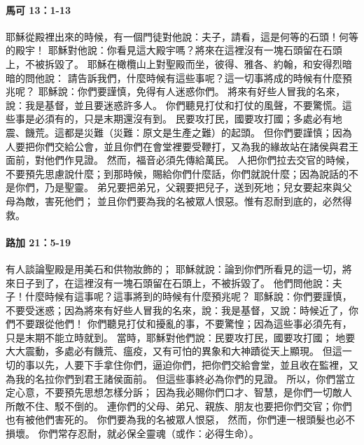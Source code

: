 \paragraph{馬可 13：1-13}
耶穌從殿裡出來的時候，有一個門徒對他說：夫子，請看，這是何等的石頭！何等的殿宇！
耶穌對他說：你看見這大殿宇嗎？將來在這裡沒有一塊石頭留在石頭上，不被拆毀了。
耶穌在橄欖山上對聖殿而坐，彼得、雅各、約翰，和安得烈暗暗的問他說：
請告訴我們，什麼時候有這些事呢？這一切事將成的時候有什麼預兆呢？
耶穌說：你們要謹慎，免得有人迷惑你們。
將來有好些人冒我的名來，說：我是基督，並且要迷惑許多人。
你們聽見打仗和打仗的風聲，不要驚慌。這些事是必須有的，只是末期還沒有到。
民要攻打民，國要攻打國；多處必有地震、饑荒。這都是災難（災難：原文是生產之難）的起頭。
但你們要謹慎；因為人要把你們交給公會，並且你們在會堂裡要受鞭打，又為我的緣故站在諸侯與君王面前，對他們作見證。
然而，福音必須先傳給萬民。
人把你們拉去交官的時候，不要預先思慮說什麼；到那時候，賜給你們什麼話，你們就說什麼；因為說話的不是你們，乃是聖靈。
弟兄要把弟兄，父親要把兒子，送到死地；兒女要起來與父母為敵，害死他們；
並且你們要為我的名被眾人恨惡。惟有忍耐到底的，必然得救。


\paragraph{路加 21：5-19}
有人談論聖殿是用美石和供物妝飾的；
耶穌就說：論到你們所看見的這一切，將來日子到了，在這裡沒有一塊石頭留在石頭上，不被拆毀了。
他們問他說：夫子！什麼時候有這事呢？這事將到的時候有什麼預兆呢？
耶穌說：你們要謹慎，不要受迷惑；因為將來有好些人冒我的名來，說：我是基督，又說：時候近了，你們不要跟從他們！
你們聽見打仗和擾亂的事，不要驚惶；因為這些事必須先有，只是末期不能立時就到。
當時，耶穌對他們說：民要攻打民，國要攻打國；
地要大大震動，多處必有饑荒、瘟疫，又有可怕的異象和大神蹟從天上顯現。
但這一切的事以先，人要下手拿住你們，逼迫你們，把你們交給會堂，並且收在監裡，又為我的名拉你們到君王諸侯面前。
但這些事終必為你們的見證。
所以，你們當立定心意，不要預先思想怎樣分訴；
因為我必賜你們口才、智慧，是你們一切敵人所敵不住、駁不倒的。
連你們的父母、弟兄、親族、朋友也要把你們交官；你們也有被他們害死的。
你們要為我的名被眾人恨惡，
然而，你們連一根頭髮也必不損壞。
你們常存忍耐，就必保全靈魂（或作：必得生命）。
